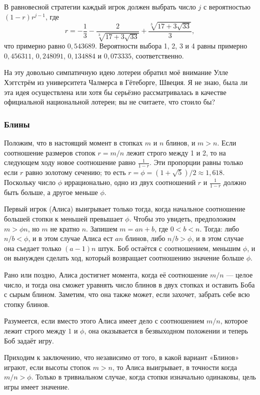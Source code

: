 В равновесной стратегии каждый игрок должен выбрать число $j$ с вероятностью $(1-r)r^{j-1}$, где 
\[r = -\frac13-\frac2{\sqrt[3]{17+3\sqrt{33}}}+\frac{\sqrt[3]{17+3\sqrt{33}}}3,\]
что примерно равно $0{,}543689$.
Вероятности выбора 1, 2, 3 и 4 равны примерно $0{,}456311$, $0{,}248091$, $0{,}134884$ и $0{,}073335$, соответственно.

На эту довольно симпатичную идею лотереи обратил моё внимание Улле Хэггстрём из университета Чалмерса в Гётеборге, Швеция. %
Я не знаю, была ли эта идея осуществлена или хотя бы серьёзно рассматривалась в качестве официальной национальной лотереи; вы не считаете, что стоило бы?

\subsubsection*{Блины}%

Положим, что в настоящий момент в стопках $m$ и $n$ блинов, и $m > n$.
Если соотношение размеров стопок $r = m/n$ лежит строго между 1 и 2, то на следующем ходу новое соотношение равно $\tfrac1{1-r}$.
Эти пропорции равны только если $r$ равно золотому сечению;
то есть $r=\phi=(1+\sqrt{5})/2\approx 1{,}618$.
Поскольку число $\phi$ иррационально, одно из двух соотношений $r$ и $\tfrac1{1-r}$ должно быть больше, а другое меньше $\phi$.

Первый игрок (Алиса) выигрывает только тогда, когда начальное соотношение большей стопки к меньшей превышает $\phi$.
Чтобы это увидеть, предположим $m>\phi n$, но $m$ не кратно $n$.
Запишем $m=an+b$, где $0<b<n$.
Тогда: либо $n/b<\phi$, и в этом случае Алиса ест $an$ блинов, либо $n/b>\phi$, и в этом случае она съедает только $(a-1)n$ штук.
Боб остаётся с соотношением, меньшим $\phi$, и он вынужден сделать ход, который возвращает соотношению значение больше $\phi$.

Рано или поздно, Алиса достигнет момента, когда её соотношение $m/n$ --- целое число, и тогда она сможет уравнять число блинов в двух стопках и оставить Боба с сырым блином.
Заметим, что она также может, если захочет, забрать себе всю стопку блинов.

Разумеется, если вместо этого Алиса имеет дело с соотношением $m/n$, которое лежит строго между $1$ и $\phi$, она оказывается в безвыходном положении %
и теперь Боб задаёт игру.

Приходим к заключению, что независимо от того, в какой вариант «Блинов» играют, если высоты стопок $m>n$, то Алиса выигрывает, в точности когда $m/n>\phi$.
Только в тривиальном случае, когда стопки изначально одинаковы, цель игры имеет значение.\heart

